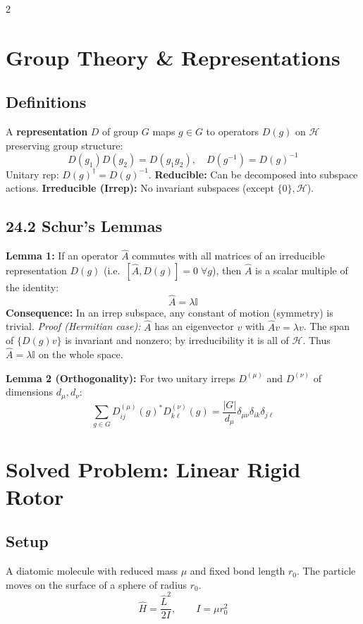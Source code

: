 \documentclass[9pt,a4paper]{article} %
\newcommand{\Hhat}{\hat{H}}
\newcommand{\Id}{\mathbb{I}}
\newcommand{\HH}{\mathcal{H}}
\begin{document}
\begin{multicols}{2}
\section{Group Theory \& Representations}

\subsection{Definitions}
A \textbf{representation} $D$ of group $G$ maps $g \in G$ to operators $D(g)$ on $\HH$ preserving group structure:
\[
D(g_1)D(g_2) = D(g_1 g_2),\quad D(g^{-1}) = D(g)^{-1}
\]
Unitary rep: $D(g)^\dagger = D(g)^{-1}$.
\textbf{Reducible:} Can be decomposed into subspace actions.
\textbf{Irreducible (Irrep):} No invariant subspaces (except $\{0\}, \HH$).

\subsection{24.2 Schur's Lemmas}
\textbf{Lemma 1:} If an operator $\hat{A}$ commutes with all matrices of an irreducible representation $D(g)$ (i.e.\ $[\hat{A}, D(g)] = 0 \;\forall g$), then $\hat{A}$ is a scalar multiple of the identity:
\[
\hat{A} = \lambda \Id
\]
\textbf{Consequence:} In an irrep subspace, any constant of motion (symmetry) is trivial.
	\textit{Proof (Hermitian case):} $\hat{A}$ has an eigenvector $v$ with $\hat{A}v=\lambda v$.
The span of $\{D(g)v\}$ is invariant and nonzero; by irreducibility it is all of $\HH$.
Thus $\hat{A}=\lambda\Id$ on the whole space.

\textbf{Lemma 2 (Orthogonality):} For two unitary irreps $D^{(\mu)}$ and $D^{(\nu)}$ of dimensions $d_\mu, d_\nu$:
\[
\sum_{g \in G} D^{(\mu)}_{ij}(g)^* D^{(\nu)}_{k\ell}(g) = \frac{|G|}{d_\mu} \delta_{\mu\nu} \delta_{ik} \delta_{j\ell}
\]
\section{Solved Problem: Linear Rigid Rotor}

\subsection{Setup}
A diatomic molecule with reduced mass $\mu$ and fixed bond length $r_0$.
The particle moves on the surface of a sphere of radius $r_0$.
\[
\Hhat = \frac{\hat{L}^2}{2I}, \qquad I = \mu r_0^2
\]


\end{multicols}
\end{document}
